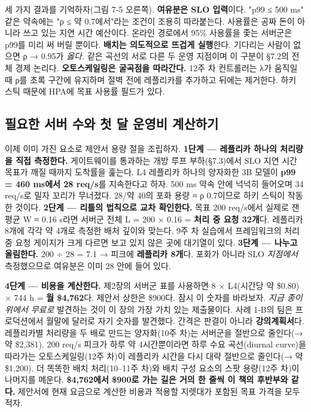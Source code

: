 세 가지 결과를 기억하자(그림 7-5 오른쪽). \textbf{여유분은 SLO 입력}이다. "p99 ≤ 500 ms" 같은 약속에는 "ρ ≤ 약 0.7에서"라는 조건이 조용히 따라붙는다. 사용률은 공짜 돈이 아니라 쓰고 있는 지연 시간 예산이다. 온라인 경로에서 95\% 사용률을 좇는 서버군은 p99를 미리 써 버릴 뿐이다. \textbf{배치는 의도적으로 뜨겁게 실행}한다. 기다리는 사람이 없으면 ρ → 0.95가 \textit{옳다.} 같은 곡선의 서로 다른 두 운영 지점이며 이 구분이 §7.2의 전체 경제 논리다. \textbf{오토스케일링은 굴곡점을 따라간다.} 12주 차 컨트롤러는 λ가 움직일 때 ρ를 초록 구간에 유지하며 절벽 전에 레플리카를 추가하고 뒤에는 제거한다. 하키 스틱 때문에 HPA에 목표 사용률 필드가 있다.

\subsection*{필요한 서버 수와 첫 달 운영비 계산하기}

이제 이미 가진 요소로 제안서 용량 절을 조립하자. \textbf{1단계 — 레플리카 하나의 처리량을 직접 측정한다.} 게이트웨이를 통과하는 개방 루프 부하(§7.3)에서 SLO 지연 시간 목표가 깨질 때까지 도착률을 훑는다. L4 레플리카 하나의 양자화한 3B 모델이 \textbf{p99 = 460 ms에서 28 req/s}를 지속한다고 하자. 500 ms 약속 안에 넉넉히 들어오며 34 req/s로 밀자 꼬리가 무너졌다. 28/약 40의 포화 용량 ≈ ρ 0.7이므로 하키 스틱이 작동한 것이다. \textbf{2단계 — 리틀의 법칙으로 교차 확인한다.} 목표 200 req/s에서 실제로 잰 평균 W ≈ 0.16 s라면 서버군 전체 L = 200 × 0.16 = \textbf{처리 중 요청 32개}다. 레플리카 8개에 각각 약 4개로 측정한 배처 깊이와 맞는다. 9주 차 실습에서 프레임워크의 처리 중 요청 게이지가 크게 다르면 보고 있지 않은 곳에 대기열이 있다. \textbf{3단계 — 나누고 올림한다.} 200 ÷ 28 = 7.1 → 피크에 \textbf{레플리카 8개}다. 포화가 아니라 SLO \textit{지점에서} 측정했으므로 여유분은 이미 28 안에 들어 있다.

\textbf{4단계 — 비용을 계산한다.} 제2장의 서버군 표를 사용하면 8 × L4(시간당 약 \$0.80) × 744 h = \textbf{월 \$4,762}다. 제안서 상한은 \$900다. 잠시 이 숫자를 바라보자. \textit{지금 종이 위에서 무료로} 발견하는 것이 이 장의 가장 가치 있는 제출물이다. 사례 1-B의 팀은 프로덕션에서 월말에 달러로 자기 숫자를 발견했다. 간격은 판결이 아니라 \textbf{강의계획서}다. 레플리카별 처리량을 두 배로 만드는 양자화(10주 차)는 서버군을 절반으로 줄인다(→ 약 \$2,381). 200 req/s 피크가 하루 약 4시간뿐이라면 하루 수요 곡선(diurnal curve)을 따라가는 오토스케일링(12주 차)이 레플리카 시간을 다시 대략 절반으로 줄인다(→ 약 \$1,200). 더 똑똑한 배치 처리(10–11주 차)와 배치 구성 요소의 스팟 용량(12주 차)이 나머지를 메운다. \textbf{\$4,762에서 \$900로 가는 길은 거의 한 줄씩 이 책의 후반부와 같다.} 제안서에 현재 요금으로 계산한 비용과 적용할 지렛대가 포함된 목표 가격을 모두 적자.


